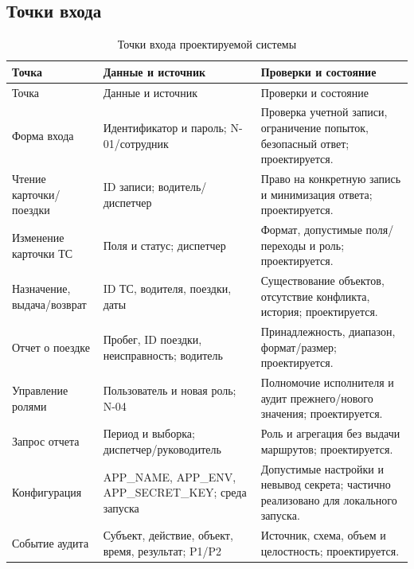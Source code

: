 \documentclass[12pt,a4paper]{article}
\begin{document}
\subsection{Точки входа}
\begin{longtable}{p{3.3cm}p{4.2cm}p{6.5cm}}
\caption{Точки входа проектируемой системы}\\
\toprule Точка & Данные и источник & Проверки и состояние\\\midrule\endfirsthead
\toprule Точка & Данные и источник & Проверки и состояние\\\midrule\endhead
Форма входа & Идентификатор и пароль; N-01/сотрудник & Проверка учетной записи, ограничение попыток, безопасный ответ; проектируется.\\
Чтение карточки/поездки & ID записи; водитель/диспетчер & Право на конкретную запись и минимизация ответа; проектируется.\\
Изменение карточки ТС & Поля и статус; диспетчер & Формат, допустимые поля/переходы и роль; проектируется.\\
Назначение, выдача/возврат & ID ТС, водителя, поездки, даты & Существование объектов, отсутствие конфликта, история; проектируется.\\
Отчет о поездке & Пробег, ID поездки, неисправность; водитель & Принадлежность, диапазон, формат/размер; проектируется.\\
Управление ролями & Пользователь и новая роль; N-04 & Полномочие исполнителя и аудит прежнего/нового значения; проектируется.\\
Запрос отчета & Период и выборка; диспетчер/руководитель & Роль и агрегация без выдачи маршрутов; проектируется.\\
Конфигурация & APP\_NAME, APP\_ENV, APP\_SECRET\_KEY; среда запуска & Допустимые настройки и невывод секрета; частично реализовано для локального запуска.\\
Событие аудита & Субъект, действие, объект, время, результат; P1/P2 & Источник, схема, объем и целостность; проектируется.\\
\bottomrule
\end{longtable}
\end{document}
